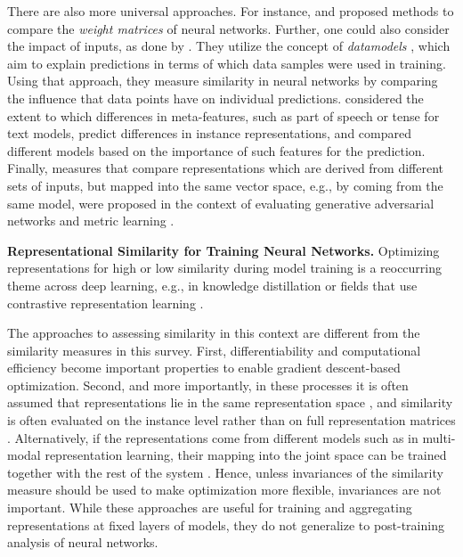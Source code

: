 \documentclass{article}
\newcommand{\citet}{\textcite}
\newcommand{\subheader}{\textbf}
\begin{document}
\begin{refsegment}
There are also more universal approaches.
For instance, \citet{wang_understanding_2022} and \citet{guth_universality_2024} proposed methods to compare the \emph{weight matrices} of neural networks.
Further, one could also consider the impact of inputs, as done by \citet{shah_modeldiff_2022}.
They utilize the concept of \emph{datamodels} \cite{ilyas_datamodels_2022}, which aim to explain predictions in terms of which data samples were used in training.
Using that approach, they measure similarity in neural networks by comparing the influence that data points have on individual predictions.
\citet{salle_thinkalike_2024} considered the extent to which differences in meta-features, such as part of speech or tense for text models, predict differences in instance representations, and compared different models based on the importance of such features for the prediction.
Finally, measures that compare representations which are derived from different sets of inputs, but mapped into the same vector space, e.g., by coming from the same model, were proposed in the context of evaluating generative adversarial networks \cite{kynkaanniemi_improved_2019,barannikov_manifold_2021} and metric learning \cite{kulis_metriclearning_survey_2013,kaya_deepmetriclearning_survey_2019}.

\subheader{Representational Similarity for Training Neural Networks.}
Optimizing representations for high or low similarity during model training is a reoccurring theme across deep learning, e.g., in knowledge distillation \cite{gou2021knowledge} or fields that use contrastive representation learning \cite{manzoor2023multimodality, wang_SurveyContinualLearning_2024,uelwer2023survey,jaiswal_contrastive_survey_2020,gan_vision_survey_2022}.

The approaches to assessing similarity in this context are different from the similarity measures in this survey.
First, differentiability and computational efficiency become important properties to enable gradient descent-based optimization.
Second, and more importantly, in these processes it is often assumed that representations lie in the same representation space \cite{kim2021vilt,kaya_deepmetriclearning_survey_2019,kulis_metriclearning_survey_2013}, and similarity is often evaluated on the instance level rather than on full representation matrices \cite{reimers-gurevych-2019-sentence,wang2023all,kim_vilt_2021}.
Alternatively, if the representations come from different models such as in multi-modal representation learning, their mapping into the joint space can be trained together with the rest of the system \cite{wang2023all}.
Hence, unless invariances of the similarity measure should be used to make optimization more flexible, invariances are not important.
While these approaches are useful for training and aggregating representations at fixed layers of models, they do not generalize to post-training analysis of neural networks.



\end{refsegment}
\end{document}
